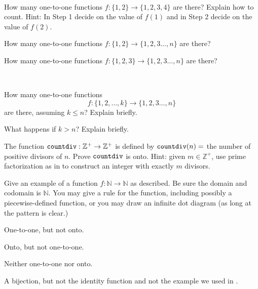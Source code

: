 \begin{exer}[\exerE] %
\label{exer_count_onetoone_fns_part1}
~
    \begin{apart}
        \item \label{part_1to1_count} How many one-to-one functions $f:\{1,2\} \to \{1,2,3,4\}$ are there? Explain how to count. Hint: In Step 1 decide on the value of $f(1)$ and in Step 2 decide on the value of $f(2)$.
        \item How many one-to-one functions $f:\{1,2\} \to \{1,2,3 \ldots,n\}$ are there?
        \item How many one-to-one functions $f:\{1,2,3\} \to \{1,2,3 \ldots,n\}$ are there?
    \end{apart}
\end{exer}

\begin{exer} [\exerE] %
\label{exer_count_onetoone_fns_part2}
~
    \begin{apart}
        \item How many one-to-one functions $$f:\{1,2, \ldots, k\} \to \{1,2,3 \ldots,n\}$$ are there, assuming $k \le n$? Explain briefly.
        \item What happens if $k > n$?   Explain briefly.
    \end{apart}
\end{exer}

\begin{exer}[\exerE] %
\label{exer_countdiv_onto}
    The function $\texttt{countdiv}: \mathbb{Z}^+ \to \mathbb{Z}^+$ is defined by $\texttt{countdiv}(n)=$ the number of positive divisors of $n$. Prove $\texttt{countdiv}$ is onto.  Hint: given $m \in \mathbb{Z}^+$, use prime factorization as in  to construct an integer with exactly $m$ divisors. 
\end{exer}

\begin{exer}[\exerE] %
\label{exer_construct_fns_on_N}
    Give an example of a function $f: \mathbb{N} \to \mathbb{N}$ as described. Be sure the domain and codomain is $\mathbb{N}$. You may give a rule for the function, including possibly a piecewise-defined function, or you may draw an infinite dot diagram (as long at the pattern is clear.)
        \begin{apart}
            \item One-to-one, but not onto.
            \item Onto, but not one-to-one.
            \item Neither one-to-one nor onto.
            \item A bijection, but not the identity function and not the example we used in .
        \end{apart}
\end{exer}

